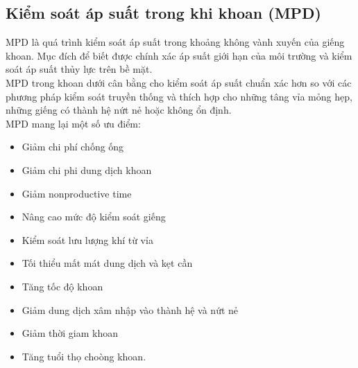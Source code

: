\documentclass[12pt,a4paper]{article}
\begin{document}
\subsection{Kiểm soát áp suất trong khi khoan (MPD)}
	MPD\cite{rehm2013managed} là quá trình kiểm soát áp suất trong khoảng không vành xuyến của giếng khoan. Mục đích để biết được chính xác áp suất giới hạn của môi trường và kiểm soát áp suất thủy lực trên bề mặt. \\
	MPD trong khoan dưới cân bằng\cite{engevik2007risk} cho kiểm soát áp suất chuẩn xác hơn so với các phương pháp kiểm soát truyền thống và thích hợp cho những tâng vỉa mỏng hẹp, những giếng có thành hệ nứt nẻ hoặc không ổn định. \\
	MPD mang lại một số ưu điểm:
	\begin{itemize}
		\item Giảm chi phí chống ống
		\item Giảm chi phi dung dịch khoan
		\item Giảm nonproductive time
		\item Nâng cao mức độ kiểm soát giếng
		\item Kiểm soát lưu lượng khí từ vỉa
		\item Tối thiểu mất mát dung dịch và kẹt cần
		\item Tăng tốc độ khoan
		\item Giảm dung dịch xâm nhập vào thành hệ và nứt nẻ
		\item Giảm thời giam khoan
		\item Tăng tuổi thọ choòng khoan.
	\end{itemize}
\end{document}
